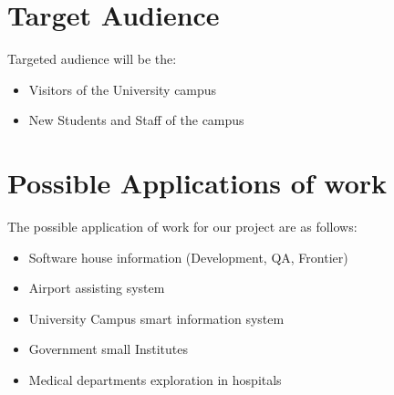 \section{Target Audience}
Targeted audience will be the:
\begin{itemize}
\item Visitors of the University campus 
\item New Students and Staff of the campus
\end{itemize}



\section{Possible Applications of work}
The possible application of work for our project are as follows:


\begin{itemize}
\item Software house information (Development, QA, Frontier)
\item Airport assisting system
\item University Campus smart information system
\item Government small Institutes
\item Medical departments exploration in hospitals
\end{itemize}


\begin{table}[h]
\centering
\begin{tabular}{l|l} \hline
\end{tabular}
\label{tab:logic_flow}
\end{table}




